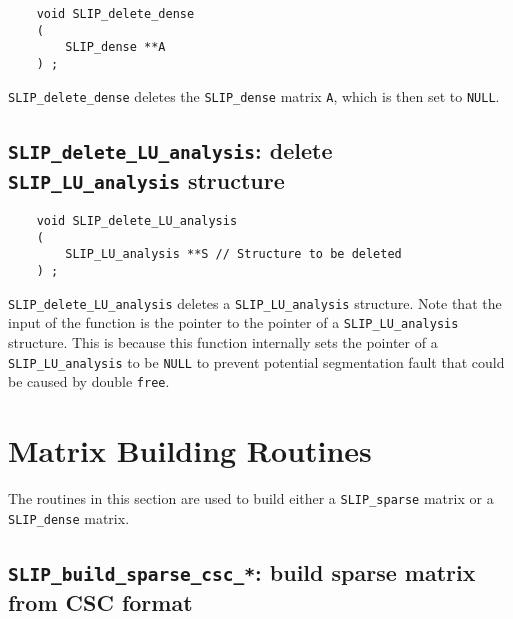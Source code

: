 \documentclass[12pt]{article}
\theoremstyle{definition}
\begin{document}
\begin{mdframed}[userdefinedwidth=6in]
{\footnotesize
\begin{verbatim}
    void SLIP_delete_dense
    (
        SLIP_dense **A
    ) ;
\end{verbatim}
} \end{mdframed}

\verb|SLIP_delete_dense| deletes the \verb'SLIP_dense' matrix \verb|A|,
which is then set to \verb|NULL|.

\cprotect\subsection{\verb|SLIP_delete_LU_analysis|: delete \verb|SLIP_LU_analysis| structure}
\label{ss:delete_LU_analysis}

\begin{mdframed}[userdefinedwidth=6in]
{\footnotesize
\begin{verbatim}
    void SLIP_delete_LU_analysis
    (
        SLIP_LU_analysis **S // Structure to be deleted
    ) ;
\end{verbatim}
} \end{mdframed}


\verb|SLIP_delete_LU_analysis| deletes a \verb|SLIP_LU_analysis| structure.
Note that the input of the function is the pointer to the pointer of a
\verb|SLIP_LU_analysis| structure. This is because this function internally
sets the pointer of a \verb|SLIP_LU_analysis| to be \verb|NULL| to prevent
potential segmentation fault that could be caused by double \verb|free|.

\section{Matrix Building Routines} \label{s:Matrix_building_routines}

The routines in this section are used to build either a \verb'SLIP_sparse'
matrix or a \verb'SLIP_dense' matrix.

\cprotect\subsection{\verb|SLIP_build_sparse_csc_*|: build sparse matrix from CSC format}
\end{document}
